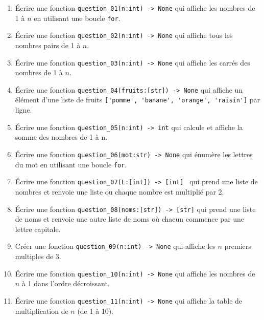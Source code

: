 
\begin{enumerate}

    \item Écrire une fonction \lstinline{question_01(n:int) -> None} qui affiche les nombres de 1 à $n$ en utilisant une boucle \lstinline{for}.

    \item Écrire une fonction \lstinline{question_02(n:int) -> None} qui affiche tous les nombres pairs de 1 à $n$.

    \item Écrire une fonction \lstinline{question_03(n:int) -> None} qui affiche les carrés des nombres de 1 à $n$.

    \item Écrire une fonction \lstinline{question_04(fruits:[str]) -> None} qui affiche un élément d'une liste de fruits \lstinline{['pomme', 'banane', 'orange', 'raisin']} par ligne.

    \item Écrire une fonction \lstinline{question_05(n:int) -> int} qui calcule et affiche la somme des nombres de 1 à n.

    \item Écrire une fonction \lstinline{question_06(mot:str) -> None} qui énumère les lettres du mot en utilisant une boucle \lstinline{for}.

    \item Écrire une fonction \lstinline{question_07(L:[int]) -> [int] } qui prend une liste de nombres et renvoie une liste ou chaque nombre est multiplié par 2.

    \item Écrire une fonction \lstinline{question_08(noms:[str]) -> [str]} qui prend une liste de noms et renvoie une autre liste de noms où chacun commence par une lettre capitale.

    \item Créer une fonction \lstinline{question_09(n:int) -> None} qui affiche les $n$ premiers multiples de 3.

    \item Écrire une fonction \lstinline{question_10(n:int) -> None} qui affiche les nombres de $n$ à 1 dans l'ordre décroissant.

    \item Écrire une fonction \lstinline{question_11(n:int) -> None} qui affiche la table de multiplication de $n$ (de 1 à 10).


\end{enumerate}
